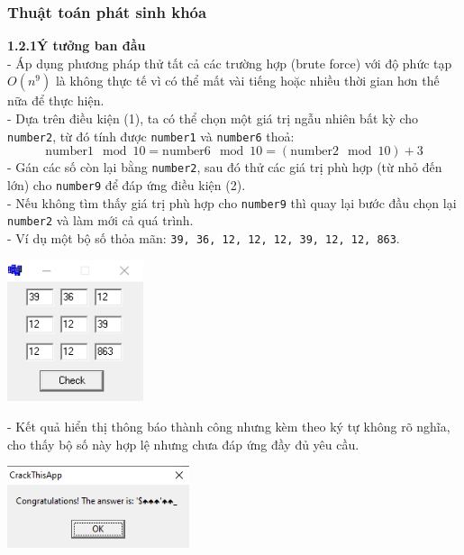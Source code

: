 \subsubsection{Thuật toán phát sinh khóa}
\noindent\textbf{1.2.1\quad Ý tưởng ban đầu}\\
- Áp dụng phương pháp thử tất cả các trường hợp (brute force) với độ phức tạp \(O(n^9)\) là không thực tế vì có thể mất vài tiếng hoặc nhiều thời gian hơn thế nữa để thực hiện.\\
- Dựa trên điều kiện (1), ta có thể chọn một giá trị ngẫu nhiên bất kỳ cho \texttt{number2}, từ đó tính được \texttt{number1} và \texttt{number6} thoả:
\[
\text{number1}\mod 10 = \text{number6}\mod 10 = (\text{number2}\mod 10) + 3
\]
- Gán các số còn lại bằng \texttt{number2}, sau đó thử các giá trị phù hợp (từ nhỏ đến lớn) cho \texttt{number9} để đáp ứng điều kiện (2). \\
- Nếu không tìm thấy giá trị phù hợp cho \texttt{number9} thì quay lại bước đầu chọn lại \texttt{number2} và làm mới cả quá trình.\\
- Ví dụ một bộ số thỏa mãn: \texttt{39, 36, 12, 12, 12, 39, 12, 12, 863}.
\begin{center}
	\includegraphics[width=0.3\textwidth]{img/file-1/image11_0.png}
\end{center}

- Kết quả hiển thị thông báo thành công nhưng kèm theo ký tự không rõ nghĩa, cho thấy bộ số này hợp lệ nhưng chưa đáp ứng đầy đủ yêu cầu.
\begin{center}
	\includegraphics[width=0.4\textwidth]{img/file-1/image11_1.png}
\end{center}

